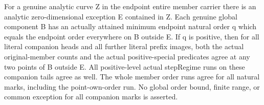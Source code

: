 \begin{theorem}
\label{hir:member-companion-positive-component-history}
\leanok
For a genuine analytic curve Z in the endpoint entire member carrier there
is an analytic zero-dimensional exception E contained in Z. Each genuine
global component B has an actually attained minimum endpoint natural order
q which equals the endpoint order everywhere on B outside E. If q is positive,
then for all literal companion heads and all further literal prefix images,
both the actual original-member counts and the actual positive-special
predicates agree at any two points of B outside E. All positive-level actual
stepRegime runs on these companion tails agree as well. The whole member
order runs agree for all natural marks, including the point-own-order run.
No global order bound, finite range, or common exception for all companion
marks is asserted.
\end{theorem}
